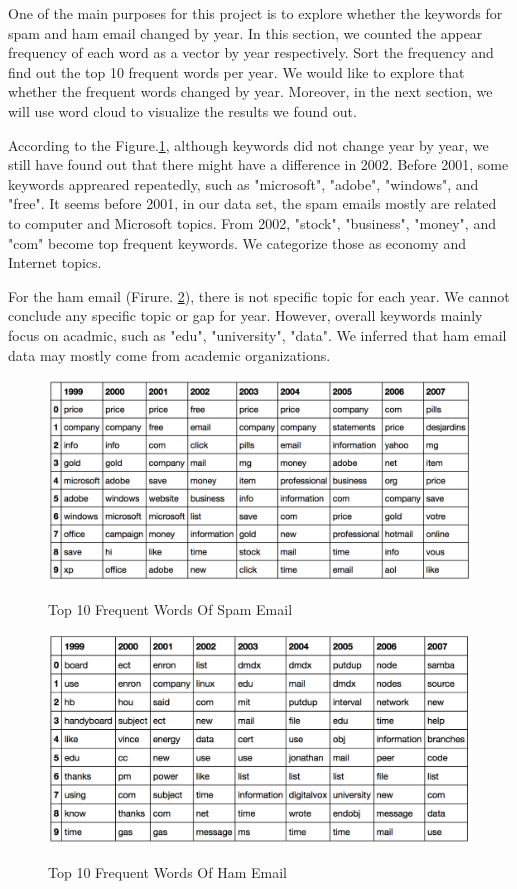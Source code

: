 \quad One of the main purposes for this project is to explore whether the keywords for spam and ham email changed by year. In this section, we counted the appear frequency of each word as a vector by year respectively. Sort the frequency and find out the top 10 frequent words per year. We would like to explore that whether the frequent words changed by year. Moreover, in the next section, we will use word cloud to visualize the results we found out.

\quad According to the Figure.\ref{fig:topwordspam}, although keywords did not change year by year, we still have found out that there might have a difference in 2002. Before 2001, some keywords appreared repeatedly, such as "microsoft", "adobe", "windows", and "free". It seems before 2001, in our data set, the spam emails mostly are related to computer and Microsoft topics. From 2002, "stock", "business", "money", and  "com" become top frequent keywords. We categorize those as economy and Internet topics. 

\quad For the ham email (Firure. \ref{fig:topwordham}), there is not specific topic for each year. We cannot conclude any specific topic or gap for year. However, overall keywords mainly focus on acadmic, such as "edu", "university", "data". We inferred that ham email data may mostly come from academic organizations.

\begin{figure}[ht!]
    \centering
    \includegraphics[width=13cm]{top_word_spam.png}\\
    \caption{Top 10 Frequent Words Of Spam Email}
    \label{fig:topwordspam}
\end{figure}


\begin{figure}[ht!]
    \centering
    \includegraphics[width=13cm]{top_word_ham.png}\\
    \caption{Top 10 Frequent Words Of Ham Email}
    \label{fig:topwordham}
\end{figure}


